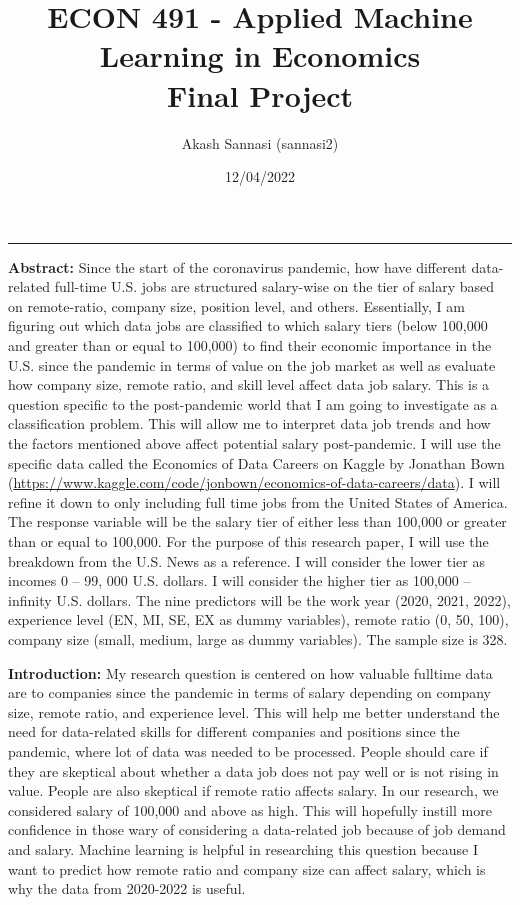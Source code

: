 \documentclass[
]{article}
\title{ECON 491 - Applied Machine Learning in Economics\\
Final Project}
\author{Akash Sannasi (sannasi2)}
\date{12/04/2022}
\begin{document}
\maketitle

\begin{center}\rule{0.5\linewidth}{0.5pt}\end{center}

\textbf{Abstract:} Since the start of the coronavirus pandemic, how have
different data-related full-time U.S. jobs are structured salary-wise on
the tier of salary based on remote-ratio, company size, position level,
and others. Essentially, I am figuring out which data jobs are
classified to which salary tiers (below 100,000 and greater than or
equal to 100,000) to find their economic importance in the U.S. since
the pandemic in terms of value on the job market as well as evaluate how
company size, remote ratio, and skill level affect data job salary. This
is a question specific to the post-pandemic world that I am going to
investigate as a classification problem. This will allow me to interpret
data job trends and how the factors mentioned above affect potential
salary post-pandemic. I will use the specific data called the Economics
of Data Careers on Kaggle by Jonathan Bown
(\url{https://www.kaggle.com/code/jonbown/economics-of-data-careers/data}).
I will refine it down to only including full time jobs from the United
States of America. The response variable will be the salary tier of
either less than 100,000 or greater than or equal to 100,000. For the
purpose of this research paper, I will use the breakdown from the U.S.
News as a reference. I will consider the lower tier as incomes 0 -- 99,
000 U.S. dollars. I will consider the higher tier as 100,000 -- infinity
U.S. dollars. The nine predictors will be the work year (2020, 2021,
2022), experience level (EN, MI, SE, EX as dummy variables), remote
ratio (0, 50, 100), company size (small, medium, large as dummy
variables). The sample size is 328.

\textbf{Introduction:} My research question is centered on how valuable
fulltime data are to companies since the pandemic in terms of salary
depending on company size, remote ratio, and experience level. This will
help me better understand the need for data-related skills for different
companies and positions since the pandemic, where lot of data was needed
to be processed. People should care if they are skeptical about whether
a data job does not pay well or is not rising in value. People are also
skeptical if remote ratio affects salary. In our research, we considered
salary of 100,000 and above as high. This will hopefully instill more
confidence in those wary of considering a data-related job because of
job demand and salary. Machine learning is helpful in researching this
question because I want to predict how remote ratio and company size can
affect salary, which is why the data from 2020-2022 is useful.
\end{document}
